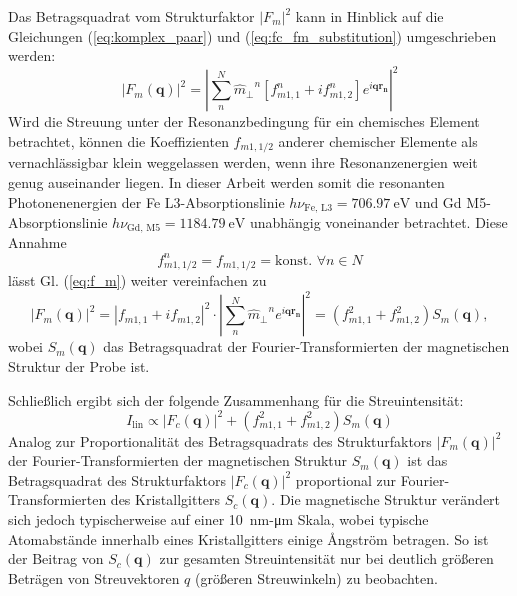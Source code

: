 \noindent
Das Betragsquadrat vom Strukturfaktor $\left|F_m\right|^2$ kann in Hinblick auf die Gleichungen (\ref{eq:komplex_paar}) und (\ref{eq:fc_fm_substitution}) umgeschrieben werden:
\begin{equation}
    \left|F_m(\mathbf{q})\right|^2 =  \left|\sum^N_n {\hat{m}_\perp}^n \left[f_{m1,1}^n + if_{m1,2}^n\right] e^{i\mathbf{qr_n}}\right|^2
    \label{eq:f_m}
\end{equation}
Wird die Streuung unter der Resonanzbedingung für ein chemisches Element betrachtet, können die Koeffizienten $f_{m1,1/2}$ anderer chemischer Elemente als vernachlässigbar klein weggelassen werden, wenn ihre Resonanzenergien weit genug auseinander liegen. In dieser Arbeit werden somit die resonanten Photonenenergien der Fe L3-Absorptionslinie $h\nu_{\text{Fe, L3}} = \SI{706.97}{\eV}$ und Gd M5-Absorptionslinie $h\nu_{\text{Gd, M5}} = \SI{1184.79}{\eV}$ unabhängig voneinander betrachtet. Diese Annahme
\begin{equation}
    f_{m1,1/2}^n = f_{m1,1/2} = \text{konst. } \forall n \in N
\end{equation}
lässt Gl. (\ref{eq:f_m}) weiter vereinfachen zu
\begin{equation}
   \left|F_m(\mathbf{q})\right|^2 = \left|f_{m1,1} + if_{m1,2}\right|^2 \cdot \left|\sum^N_n {\hat{m}_\perp}^n e^{i\mathbf{qr_n}}\right|^2 = \left(f_{m1,1}^2 + f_{m1,2}^2\right)S_m(\mathbf{q}),
\end{equation}
wobei $S_m(\mathbf{q})$ das Betragsquadrat der Fourier-Transformierten der magnetischen Struktur der Probe ist.

\noindent
Schließlich ergibt sich der folgende Zusammenhang für die Streuintensität:
\begin{equation}
    I_{\text{lin}} \propto  \left| F_c(\mathbf{q}) \right|^2 + \left(f_{m1,1}^2 + f_{m1,2}^2\right)S_m(\mathbf{q})
    \label{eq:intensitat_fourier}
\end{equation}
\noindent
Analog zur Proportionalität des Betragsquadrats des Strukturfaktors $\left|F_m(\mathbf{q})\right|^2$ der Fourier-Trans\-for\-mier\-ten der magnetischen Struktur $S_m(\mathbf{q})$ ist das Betragsquadrat des Strukturfaktors $\left|F_c(\mathbf{q})\right|^2$ proportional zur Fourier-Transformierten des Kristallgitters $S_c(\mathbf{q})$. Die magnetische Struktur verändert sich jedoch typischerweise auf einer \SI{10}{\nano\meter}-\si{\micro\meter} Skala, wobei typische Atomabstände innerhalb eines Kristallgitters einige Ångström betragen. So ist der Beitrag von $S_c(\mathbf{q})$ zur gesamten Streuintensität nur bei deutlich größeren Beträgen von Streuvektoren $q$ (größeren Streuwinkeln) zu beobachten.%


